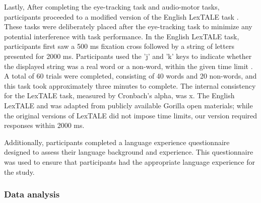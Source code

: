 Lastly, After completing the eye-tracking task and audio-motor tasks, participants proceeded to a modified version of the English LexTALE task \citep{lemhofer2012introducing}. These tasks were deliberately placed after the eye-tracking task to minimize any potential interference with task performance. In the English LexTALE task, participants first saw a 500 ms fixation cross followed by a string of letters presented for 2000 ms. Participants used the 'j' and 'k' keys to indicate whether the displayed string was a real word or a non-word, within the given time limit \citep{lemhofer2012introducing}. A total of 60 trials were completed, consisting of 40 words and 20 non-words, and this task took approximately three minutes to complete. The internal consistency for the LexTALE task, measured by Cronbach’s alpha, was x. The English LexTALE and was adapted from publicly available Gorilla open materials; while the original versions of LexTALE did not impose time limits, our version required responses within 2000 ms.

Additionally, participants completed a language experience questionnaire designed to assess their language background and experience. This questionnaire was used to ensure that participants had the appropriate language experience for the study.

\subsubsection{Data analysis}

